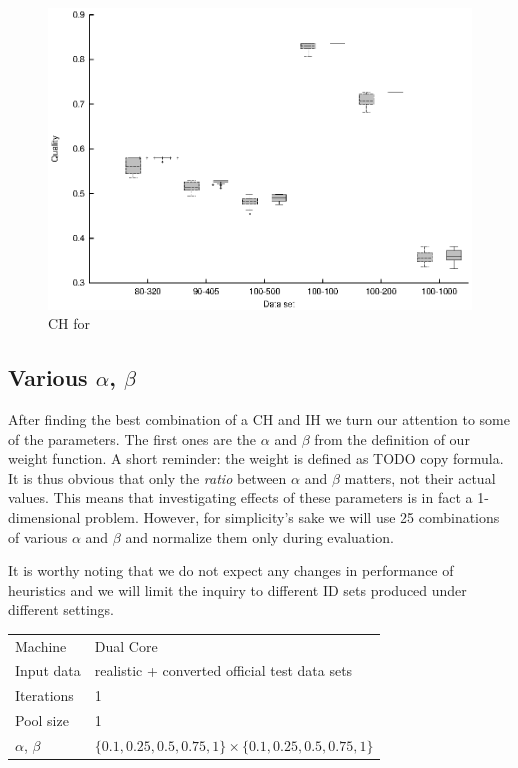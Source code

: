 \begin{figure}
  \caption{CH for }
  \label{image-experiment-ch-for-mutation}
  \centering
    \includegraphics[width=\textwidth]{images/experiments/ch-for-mutation}
\end{figure}

\subsection{Various $\alpha$, $\beta$}

After finding the best combination of a CH and IH we turn our attention to some of the parameters. The first ones are the $\alpha$ and $\beta$ from the definition of our weight function. %
A short reminder: the weight is defined as TODO copy formula. It is thus obvious that only the \textit{ratio} between $\alpha$ and $\beta$ matters, not their actual values. This means that investigating effects of these parameters is in fact a 1-dimensional problem. However, for simplicity's sake we will use 25 combinations of various $\alpha$ and $\beta$ and normalize them only during evaluation.

It is worthy noting that we do not expect any changes in performance of heuristics and we will limit the inquiry to different ID sets produced under different settings.

\begin{center}
\bigskip
\begin{tabular}{| l | l |}
  \hline
  \hline
  Machine           & Dual Core \\
  Input data        & realistic + converted official test data sets \\
  Iterations        & 1 \\
  Pool size         & 1 \\
  $\alpha$, $\beta$ & $\{0.1, 0.25, 0.5, 0.75, 1\} \times \{0.1, 0.25, 0.5, 0.75, 1\}$ \\ %
  \hline
\end{tabular}
\bigskip
\end{center}

